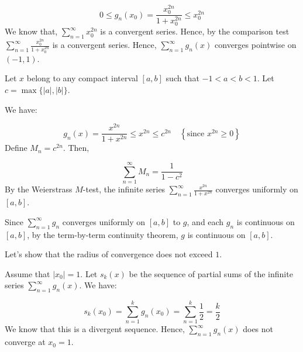 \documentclass[10pt]{article}
\begin{document}
\begin{equation*}
0\leq g_{n}( x_{0}) =\frac{x_{0}^{2n}}{1+x_{0}^{2n}} \leq x_{0}^{2n}
\end{equation*}
We know that, $\displaystyle \sum _{n=1}^{\infty } x_{0}^{2n}$ is a convergent series. Hence, by the comparison test $\displaystyle \sum _{n=1}^{\infty }\frac{x_{0}^{2n}}{1+x_{0}^{2n}}$ is a convergent series. Hence, $\displaystyle \sum _{n=1}^{\infty } g_{n}( x)$ converges pointwise on $\displaystyle ( -1,1)$.



Let $\displaystyle x$ belong to any compact interval $\displaystyle [ a,b]$ such that $\displaystyle -1< a< b< 1$. Let $\displaystyle c=\max\{|a|,|b|\}$. 



We have:


\begin{equation*}
g_{n}( x) =\frac{x^{2n}}{1+x^{2n}} \leq x^{2n} \leq c^{2n} \quad \left\{\text{since } x^{2n} \geq 0\right\}
\end{equation*}
Define $\displaystyle M_{n} =c^{2n}$. Then,


\begin{equation*}
\sum _{n=1}^{\infty } M_{n} =\frac{1}{1-c^{2}}
\end{equation*}
By the Weierstrass $\displaystyle M$-test, the infinite series $\displaystyle \sum _{n=1}^{\infty }\frac{x^{2n}}{1+x^{2n}}$ converges uniformly on $\displaystyle [ a,b]$. 

Since $\displaystyle \sum _{n=1}^{\infty } g_{n}$ converges uniformly on $\displaystyle [ a,b]$ to $\displaystyle g$, and each $\displaystyle g_{n}$ is continuous on $\displaystyle [ a,b]$, by the term-by-term continuity theorem, $\displaystyle g$ is continuous on $\displaystyle [ a,b]$.



Let's show that the radius of convergence does not exceed $\displaystyle 1$. 



Assume that $\displaystyle |x_{0} |=1$. Let $\displaystyle s_{k}( x)$ be the sequence of partial sums of the infinite series $\displaystyle \sum _{n=1}^{\infty } g_{n}( x)$. We have:


\begin{equation*}
s_{k}( x_{0}) =\sum _{n=1}^{k} g_{n}( x_{0}) =\sum _{n=1}^{k}\frac{1}{2} =\frac{k}{2}
\end{equation*}
We know that this is a divergent sequence. Hence, $\displaystyle \sum _{n=1}^{\infty } g_{n}( x)$ does not converge at $\displaystyle x_{0} =1$.
\end{document}
